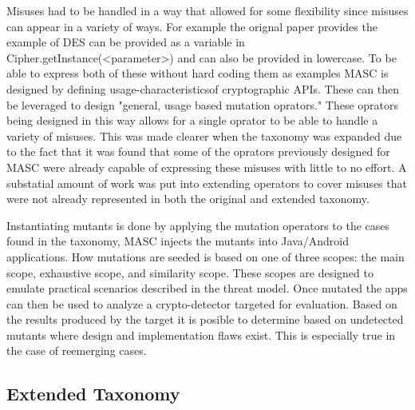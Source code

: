 Misuses had to be handled in a way that allowed for some flexibility since misuses can appear in a variety of ways. For example the orignal paper provides the example of DES can be provided as a variable in Cipher.getInstance(<parameter>) and can also be provided in lowercase. To be able to express both of these without hard coding them as examples MASC is designed by defining usage-characteristicsof cryptographic APIs. These can then be leveraged to design "general, usage based mutation oprators." These oprators being designed in this way allows for a single oprator to be able to handle a variety of misuses. This was made clearer when the taxonomy was expanded due to the fact that it was found that some of the oprators previously designed for MASC were already capable of expressing these misuses with little to no effort. A substatial amount of work was put into extending operators to cover misuses that were not already represented in both the original and extended taxonomy.

Instantiating mutants is done by applying the mutation operators to the cases found in the taxonomy, MASC injects the mutants into Java/Android applications. How mutations are seeded is based on one of three scopes: the main scope, exhaustive scope, and similarity scope. These scopes are designed to emulate practical scenarios described in the threat model. Once mutated the apps can then be used to analyze a crypto-detector targeted for evaluation. Based on the results produced by the target it is posible to determine based on undetected mutants where design and implementation flaws exist. This is especially true in the case of reemerging cases.

\subsection{Extended Taxonomy}
\label{ch2:sec:taxonomy}


